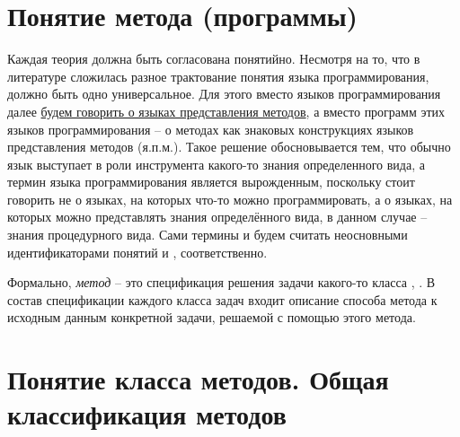 \section{Понятие метода (программы)}

Каждая теория должна быть согласована понятийно. Несмотря на то, что в литературе сложилась разное трактование понятия языка программирования, должно быть одно универсальное. Для этого вместо языков программирования далее \underline{будем говорить о языках представления методов}, а вместо программ этих языков программирования -- о методах как знаковых конструкциях языков представления методов (я.п.м.). Такое решение обосновывается тем, что обычно язык выступает в роли инструмента какого-то знания определенного вида, а термин языка программирования является вырожденным, поскольку стоит говорить не о языках, на которых что-то можно программировать, а о языках, на которых можно представлять знания определённого вида, в данном случае -- знания процедурного вида. Сами термины  и  будем считать неосновными идентификаторами понятий  и , соответственно.

Формально, \textit{метод} -- это спецификация решения задачи какого-то класса \cite{Standard2021}, \cite{Tuzov1986}. В состав спецификации каждого класса задач входит описание способа  метода к исходным данным конкретной задачи, решаемой с помощью этого метода.

\begin{SCn}
\end{SCn}

\section{Понятие класса методов. Общая классификация методов}

